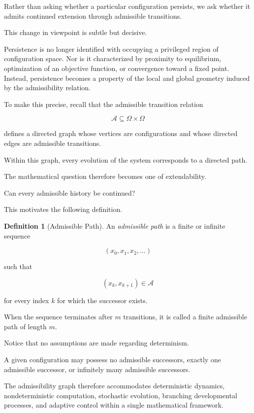 \documentclass[11pt]{book}
\numberwithin{equation}{chapter}
\theoremstyle{definition}
\newtheorem{definition}{Definition}[chapter]
\theoremstyle{plain}
\begin{document}
Rather than asking whether a particular configuration persists, we ask whether it admits continued extension through admissible transitions.

This change in viewpoint is subtle but decisive.

Persistence is no longer identified with occupying a privileged region of configuration space. Nor is it characterized by proximity to equilibrium, optimization of an objective function, or convergence toward a fixed point. Instead, persistence becomes a property of the local and global geometry induced by the admissibility relation.

To make this precise, recall that the admissible transition relation

\[
\mathcal{A}\subseteq\Omega\times\Omega
\]

defines a directed graph whose vertices are configurations and whose directed edges are admissible transitions.

Within this graph, every evolution of the system corresponds to a directed path.

The mathematical question therefore becomes one of extendability.

Can every admissible history be continued?

This motivates the following definition.

\begin{definition}[Admissible Path]

An \emph{admissible path} is a finite or infinite sequence

\[
(x_0,x_1,x_2,\ldots)
\]

such that

\[
(x_k,x_{k+1})\in\mathcal A
\]

for every index \(k\) for which the successor exists.

When the sequence terminates after \(m\) transitions, it is called a finite admissible path of length \(m\).

\end{definition}

Notice that no assumptions are made regarding determinism.

A given configuration may possess no admissible successors, exactly one admissible successor, or infinitely many admissible successors.

The admissibility graph therefore accommodates deterministic dynamics, nondeterministic computation, stochastic evolution, branching developmental processes, and adaptive control within a single mathematical framework.
\end{document}
